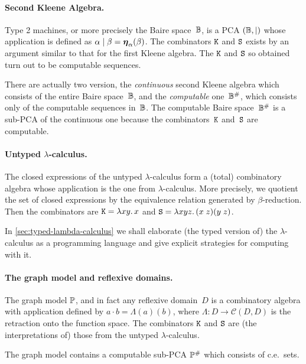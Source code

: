 \paragraph{Second Kleene Algebra.}

Type 2 machines, or more precisely the Baire space~$\mathbb{B}$, is a PCA
$(\mathbb{B}, {\mid})$ whose application is defined as $\alpha \mid \beta
= \text{\boldmath{$\eta$}}_{\alpha}(\beta)$. The combinators $\mathtt{K}$ and $\mathtt{S}$ exists
by an argument similar to that for the first Kleene algebra. The
$\mathtt{K}$ and $\mathtt{S}$ so obtained turn out to be computable sequences.

There are actually two version, the \emph{continuous} second Kleene
algebra which consists of the entire Baire space~$\mathbb{B}$, and the
\emph{computable} one~$\mathbb{B}^{\#}$, which consists only of the
computable sequences in~$\mathbb{B}$. The computable Baire
space~$\mathbb{B}^{\#}$ is a sub-PCA of the continuous one because the
combinators~$\mathtt{K}$ and~$\mathtt{S}$ are computable.

\paragraph{Untyped $\lambda$-calculus.}

The closed expressions of the untyped $\lambda$-calculus form a
(total) combinatory algebra whose application is the one from
$\lambda$-calculus. More precisely, we quotient the set of closed
expressions by the equivalence relation generated by
$\beta$-reduction. Then the combinators are $\mathtt{K} = \lambda x y .\,x$
and $\mathtt{S} = \lambda x y z .\,(x \; z)(y \; z)$.

In \cref{sec:typed-lambda-calculus} we shall elaborate
(the typed version of) the $\lambda$-calculus as a programming
language and give explicit strategies for computing with it.


\paragraph{The graph model and reflexive domains.}

The graph model $\mathbb{P}$, and in fact any reflexive domain~$D$ is a
combinatory algebra with application defined by $a \cdot b =
\Lambda(a)(b)$, where $\Lambda : D \to \mathcal{C}(D, D)$ is the
retraction onto the function space. The combinators $\mathtt{K}$ and
$\mathtt{S}$ are (the interpretations of) those from the untyped
$\lambda$-calculus.

The graph model contains a computable sub-PCA $\mathbb{P}^{\#}$ which
consists of c.e.~sets.


